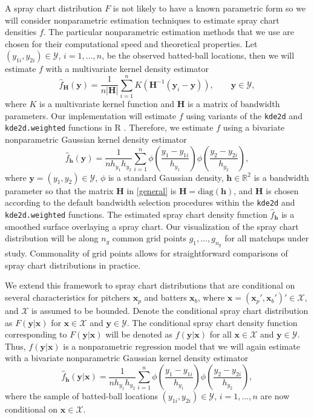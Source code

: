 \documentclass[12pt]{article}
\newcommand{\R}{\mathbb{R}}
\newcommand{\Y}{\mathcal{Y}}
\newcommand{\X}{\mathcal{X}}
\newcommand{\Hbf}{\textbf{H}}
\newcommand{\y}{\textbf{y}}
\newcommand{\x}{\textbf{x}}
\newcommand{\h}{\textbf{h}}
\begin{document}
A spray chart distribution $F$ is not likely to have a known parametric form so we will consider nonparametric estimation techniques to estimate spray chart densities $f$. The particular nonparametric estimation methods that we use are chosen for their computational speed and theoretical properties. Let $(y_{1i},y_{2i}) \in \Y$, $i = 1, \ldots, n$, be the observed batted-ball locations, then we will estimate $f$ with a multivariate kernel density estimator
\begin{equation} \label{general}
  \hat f_\Hbf(\y) = \frac{1}{n|\Hbf|}\sum_{i=1}^{n} K\left(\Hbf^{-1}(\y_i - \y)\right),
  \qquad \y \in \Y,
\end{equation}
where $K$ is a multivariate kernel function and $\Hbf$ is a matrix of bandwidth parameters. Our implementation will estimate $f$ using variants of the \texttt{kde2d} and \texttt{kde2d.weighted} functions in R \citep{MASS, ggtern}. %
Therefore, we estimate $f$ using a bivariate nonparametric Gaussian kernel density estimator
\begin{equation} \label{spraydens}
  \hat f_\h(\y) =
    \frac{1}{n h_{y_1}h_{y_2}}\sum_{i=1}^{n} \phi\left(\frac{y_1 - y_{1i}}{h_{y_1}}\right)
      \phi\left(\frac{y_2 - y_{2i}}{h_{y_2}}\right),
\end{equation}
where $\y = (y_1, y_2) \in \Y$, $\phi$ is a standard Gaussian density, $\h \in \R^2$ is a bandwidth parameter so that the matrix $\Hbf$ in \eqref{general} is $\Hbf = \text{diag}(\h)$, and $\Hbf$ is chosen according to the default bandwidth selection procedures within the \texttt{kde2d} and \texttt{kde2d.weighted} functions. The estimated spray chart density function $\hat f_\h$ is a smoothed surface overlaying a spray chart. Our visualization of the spray chart distribution will be along $n_g$ common grid points $g_1,\ldots,g_{n_g}$ for all matchups under study. Commonality of grid points allows for straightforward comparisons of spray chart distributions in practice.

We extend this framework to spray chart distributions that are conditional on several characteristics for pitchers $\x_p$ and batters $\x_b$, where $\x = (\x_p',\x_b')' \in \X$, and $\X$ is assumed to be bounded. Denote the conditional spray chart distribution as $F(\y|\x)$ for $\x \in \X$ and $\y \in \Y$. The conditional spray chart density function corresponding to $F(\y|\x)$ will be denoted as $f(\y|\x)$ for all $\x \in \X$ and $\y \in \Y$. Thus, $f(\y|\x)$ is a nonparametric regression model that we will again estimate with a bivariate nonparametric Gaussian kernel density estimator
\begin{equation} \label{spraydens-cov}
  \hat f_\h(\y|\x) =
    \frac{1}{n h_{y_1}h_{y_2}}\sum_{i=1}^{n} \phi\left(\frac{y_1 - y_{1i}}{h_{y_1}}\right)
      \phi\left(\frac{y_2 - y_{2i}}{h_{y_2}}\right),
\end{equation}
where the sample of batted-ball locations $(y_{1i},y_{2i}) \in \Y$, $i = 1, \ldots, n$ are now conditional on $\x \in \X$.
\end{document}
